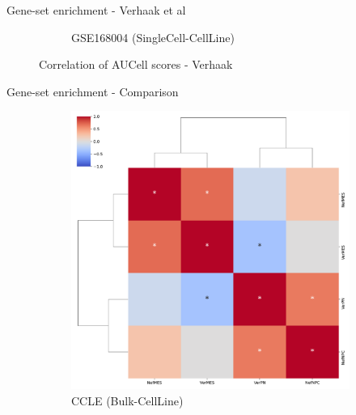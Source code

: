 \documentclass[aspectratio=169,9pt]{beamer}
\begin{document}
\begin{frame}{Gene-set enrichment - Verhaak et al}
\begin{adjustwidth}{-5cm}{-5cm}
\begin{figure}
\begin{subfigure}[c]{0.48\textwidth}
                    \caption{GSE168004 (SingleCell-CellLine)}
                \end{subfigure}
                \caption{Correlation of AUCell scores - Verhaak}
            \end{figure}
        \end{adjustwidth}
    \end{frame}

    \begin{frame}{Gene-set enrichment - Comparison}
        \begin{adjustwidth}{-5cm}{-5cm}
            \centering
            \begin{figure}\ContinuedFloat
                \centering
                \begin{subfigure}[c]{0.48\textwidth}
                    \centering
                    \includegraphics[width=\textwidth]{GSEA_CCLE_corrplot_2D}
                    \caption{CCLE (Bulk-CellLine)}
                \end{subfigure}
                \begin{subfigure}[c]{0.48\textwidth}
                    \centering

\end{subfigure}
\end{figure}
\end{adjustwidth}
\end{frame}
\end{document}
